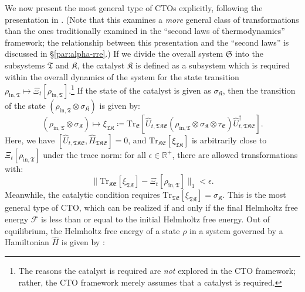 \documentclass[preprints,article,accept,moreauthors,pdftex]{Definitions/mdpi}
\begin{document}
\begin{paracol}{2}
We now present the most general type of CTOs explicitly, following the presentation in \cite{Mueller18}. (Note that this examines a \emph{more} general class of transformations than the ones traditionally examined in the ``second laws of thermodynamics'' framework; the relationship between this presentation and the ``second laws'' is discussed in \S\ref{par:alpha-rre}.) If we divide the overall system $\mathfrak{S}$ into the subsystems $\mathfrak{T}$ and $\mathfrak{K}$, the catalyst $\mathfrak{K}$ is defined as a subsystem which is required within the overall dynamics of the system for the state transition $\rho_{\mathrm{in},\mathfrak{T}} \mapsto \Xi_{t} \left[\rho_{\mathrm{in},\mathfrak{T}}\right]$.\footnote{The reasons the catalyst is required are \emph{not} explored in the CTO framework; rather, the CTO framework merely assumes that a catalyst is required.} If the state of the catalyst is given as $\sigma_{\mathfrak{K}}$, then the transition of the state $\left(\rho_{\mathrm{in},\mathfrak{T}} \otimes \sigma_{\mathfrak{K}} \right)$ is given \cite{Mueller18} by:
\begin{equation}
    \label{eq:Markus-CTO}
    \left(\rho_{\mathrm{in},\mathfrak{T}} \otimes \sigma_{\mathfrak{K}} \right) \mapsto \xi_{\mathfrak{TK}} \coloneqq \mathrm{Tr}_{\mathfrak{E}} \left[ \widehat{U}_{t,\mathfrak{TKE}} \left( \rho_{\mathrm{in},\mathfrak{T}} \otimes \sigma_{\mathfrak{K}} \otimes \tau_{\mathfrak{E}} \right) \widehat{U}_{t,\mathfrak{TKE}}^{\dagger} \right].
\end{equation}
Here, we have $\left[\widehat{U}_{t,\mathfrak{TKE}}, \widehat{H}_{\mathfrak{TKE}}\right] = 0$, and $\mathrm{Tr}_{\mathfrak{KE}}\left[\xi_{\mathfrak{TK}}\right]$ is arbitrarily close to $\Xi_{t} \left[\rho_{\mathrm{in},\mathfrak{T}}\right]$ under the trace norm: for all $\epsilon \in \mathbb{R}^{+}$, there are allowed transformations with:
\begin{equation}
    \label{eq:Markus-CTO-trace-norm}
    \lVert\mathrm{Tr}_{\mathfrak{KE}}\left[\xi_{\mathfrak{TK}}\right] - \Xi_{t} \left[\rho_{\mathrm{in},\mathfrak{T}}\right]\rVert_{1} < \epsilon.
\end{equation}
Meanwhile, the catalytic condition requires $\mathrm{Tr}_{\mathfrak{TE}}\left[\xi_{\mathfrak{TK}}\right] = \sigma_{\mathfrak{K}}$. This is the most general type of CTO, which can be realized if and only if the final Helmholtz free energy $\mathcal{F}$ is less than or equal to the initial Helmholtz free energy. Out of equilibrium, the Helmholtz free energy of a state $\rho$ in a system governed by a Hamiltonian $\widehat{H}$ is given by \cite{BL55,PHS15}:

\end{paracol}
\end{document}
